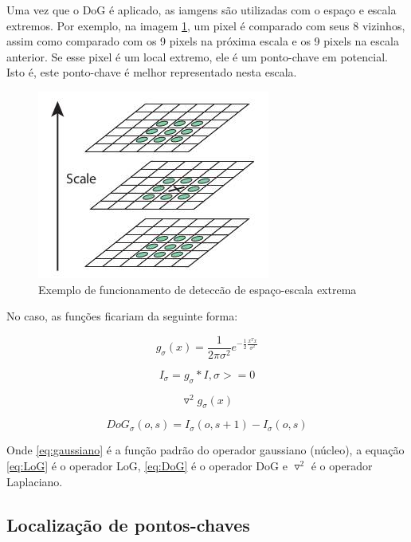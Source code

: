 Uma vez que o DoG é aplicado, as iamgens são utilizadas com o espaço e escala extremos. Por exemplo, na imagem \ref{fig:extrema}, um pixel é comparado com seus 8 vizinhos, assim como comparado com os 9 pixels na próxima escala e os 9 pixels na escala anterior. Se esse pixel é um local extremo, ele é um ponto-chave em potencial. Isto é, este ponto-chave é melhor representado nesta escala.

\begin{figure}
	\centering
	\includegraphics[width=0.45\linewidth]{figs/sift_local_extrema.jpg}
	\caption{%
	Exemplo de funcionamento de deteccão de espaço-escala extrema
	}\label{fig:extrema}
\end{figure}

No caso, as funções ficariam da seguinte forma: 

\begin{equation}
\label{eq:gaussiano}
	g_\sigma(x) = \frac{1}{2 \pi \sigma ^2} e^{-\frac{1}{2} \frac{x^T x}{\sigma ^2}}
\end{equation}

\begin{equation}
\label{eq:gaussianScaleSpace}
	I_\sigma = g_\sigma * I, \sigma >= 0
\end{equation}

\begin{equation}
\label{eq:LoG}
	\triangledown^2	g_\sigma(x)
\end{equation}

\begin{equation}
\label{eq:DoG}
	DoG_\sigma(o,s) = I_\sigma(o,s+1) - I_\sigma(o,s)
\end{equation}


Onde \ref{eq:gaussiano} é a função padrão do operador gaussiano (núcleo), a equação \ref{eq:LoG} é o operador LoG,  \ref{eq:DoG} é o operador DoG e $\triangledown^2$ é o operador Laplaciano.

\subsection{Localização de pontos-chaves}

